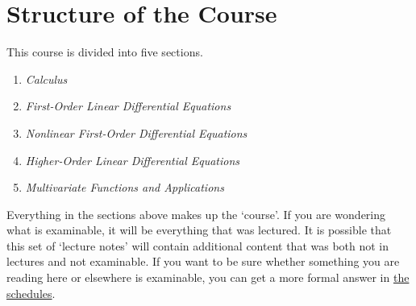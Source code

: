 \documentclass[a4paper]{scrreprt}
\begin{document}
\section{Structure of the Course}

This course is divided into five sections.

\begin{enumerate}
	\item \emph{Calculus}
	


	\item \emph{First-Order Linear Differential Equations}
	

	\item \emph{Nonlinear First-Order Differential Equations}
	\item \emph{Higher-Order Linear Differential Equations}
	\item \emph{Multivariate Functions and Applications}
	

\end{enumerate}

Everything in the sections above makes up the `course'. If you are wondering what is examinable, it will be everything that was lectured. It is possible that this set of `lecture notes' will contain additional content that was both not in lectures and not examinable. If you want to be sure whether something you are reading here or elsewhere is examinable, you can get a more formal answer in \href{https://www.maths.cam.ac.uk/undergrad/files/schedules.pdf}{the schedules}.
\end{document}
